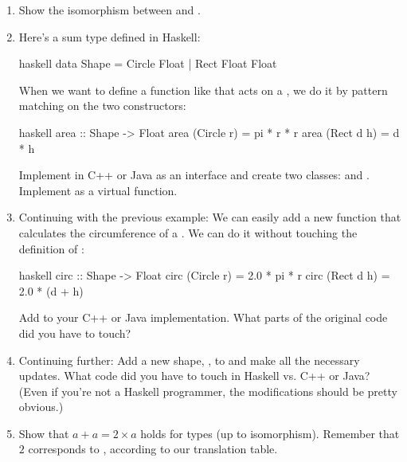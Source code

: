 \begin{enumerate}
\tightlist
\item
  Show the isomorphism between  and
  .
\item
  Here's a sum type defined in Haskell:

\begin{snip}{haskell}
data Shape = Circle Float
           | Rect Float Float
\end{snip}
  When we want to define a function like  that acts on a
  , we do it by pattern matching on the two constructors:

\begin{snip}{haskell}
area :: Shape -> Float
area (Circle r) = pi * r * r
area (Rect d h) = d * h
\end{snip}
  Implement  in C++ or Java as an interface and create two
  classes:  and . Implement  as
  a virtual function.
\item
  Continuing with the previous example: We can easily add a new function
   that calculates the circumference of a .
  We can do it without touching the definition of :

\begin{snip}{haskell}
circ :: Shape -> Float
circ (Circle r) = 2.0 * pi * r
circ (Rect d h) = 2.0 * (d + h)
\end{snip}
  Add  to your C++ or Java implementation. What parts of
  the original code did you have to touch?
\item
  Continuing further: Add a new shape, , to
   and make all the necessary updates. What code did you
  have to touch in Haskell vs. C++ or Java? (Even if you're not a
  Haskell programmer, the modifications should be pretty obvious.)
\item
  Show that $a + a = 2 \times a$ holds for types (up to
  isomorphism). Remember that $2$ corresponds to ,
  according to our translation table.
\end{enumerate}
